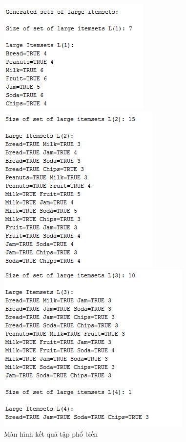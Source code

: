 \documentclass{article}
\begin{document}
\begin{figure}[H]
	\centering
	\caption{Màn hình kết quả tập phổ biến}
	\begin{minipage}{0.4\textwidth}
		\centering
		\includegraphics[scale = 0.5]{freset1}
	\end{minipage}%
	\begin{minipage}{0.4\textwidth}
		\centering
		\includegraphics[scale = 0.5]{freset2}
	\end{minipage}%
	\begin{minipage}{0.4\textwidth}
		\centering
		\includegraphics[scale = 0.5]{freset3}
	\end{minipage}%
\end{figure}
\end{document}
